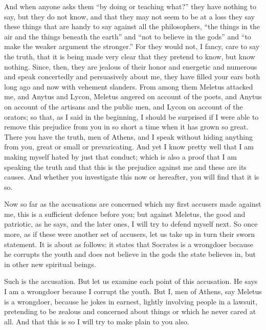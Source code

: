 And when anyone asks them “by doing or teaching what?” they have nothing to say, but they do not know, and that they may not seem to be at a loss they say these things that are handy to say against all the philosophers, “the things in the air and the things beneath the earth” and “not to believe in the gods” and “to make the weaker argument the stronger.” For they would not, I fancy, care to say the truth, that it is being made very clear that they pretend to know, but know nothing.  Since, then, they are jealous of their honor and energetic and numerous and speak concertedly and persuasively about me, they have filled your ears both long ago and now with vehement slanders. From among them Meletus attacked me, and Anytus and Lycon, Meletus angered on account of the poets, and Anytus on account of the artisans and the public men,  and Lycon on account of the orators; so that, as I said in the beginning, I should be surprised if I were able to remove this prejudice from you in so short a time when it has grown so great. There you have the truth, men of Athens, and I speak without hiding anything from you, great or small or prevaricating. And yet I know pretty well that I am making myself hated by just that conduct; which is also a proof that I am speaking the truth and that this is the prejudice against me and these are its causes. And whether you investigate  this now or hereafter, you will find that it is so.

Now so far as the accusations are concerned which my first accusers made against me, this is a sufficient defence before you; but against Meletus, the good and patriotic, as he says, and the later ones, I will try to defend myself next. So once more, as if these were another set of accusers, let us take up in turn their sworn statement. It is about as follows: it states that Socrates is a wrongdoer because he corrupts the youth and does not believe in the gods the state believes in, but in other  new spiritual beings.

Such is the accusation. But let us examine each point of this accusation. He says I am a wrongdoer because I corrupt the youth. But I, men of Athens, say Meletus is a wrongdoer, because he jokes in earnest, lightly involving people in a lawsuit, pretending to be zealous and concerned about things or which he never cared at all. And that this is so I will try to make plain to you also.

